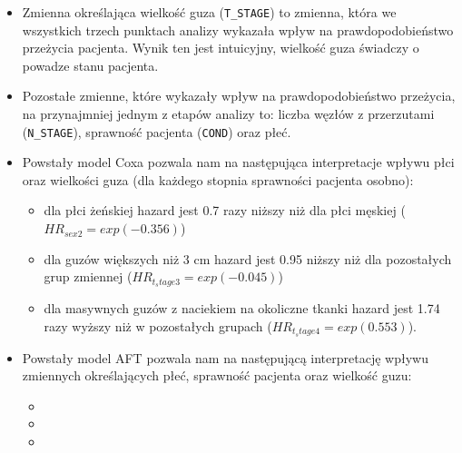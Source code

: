 \documentclass[
]{article}
\providecommand{\tightlist}{%
  \setlength{\itemsep}{0pt}\setlength{\parskip}{0pt}}
\begin{document}
\begin{itemize}
\item
  Zmienna określająca wielkość guza (\texttt{T\_STAGE}) to zmienna,
  która we wszystkich trzech punktach analizy wykazała wpływ na
  prawdopodobieństwo przeżycia pacjenta. Wynik ten jest intuicyjny,
  wielkość guza świadczy o powadze stanu pacjenta.
\item
  Pozostałe zmienne, które wykazały wpływ na prawdopodobieństwo
  przeżycia, na przynajmniej jednym z etapów analizy to: liczba węzłów z
  przerzutami (\texttt{N\_STAGE}), sprawność pacjenta (\texttt{COND})
  oraz płeć.
\item
  Powstały model Coxa pozwala nam na następująca interpretacje wpływu
  płci oraz wielkości guza (dla każdego stopnia sprawności pacjenta
  osobno):

  \begin{itemize}
  \item
    dla płci żeńskiej hazard jest 0.7 razy niższy niż dla płci męskiej
    (\(HR_{sex2} = exp(-0.356)\))
  \item
    dla guzów większych niż 3 cm hazard jest 0.95 niższy niż dla
    pozostałych grup zmiennej (\(HR_{t_stage3} = exp(-0.045)\))
  \item
    dla masywnych guzów z naciekiem na okoliczne tkanki hazard jest 1.74
    razy wyższy niż w pozostałych grupach
    (\(HR_{t_stage4} = exp(0.553)\)).
  \end{itemize}
\item
  Powstały model AFT pozwala nam na następującą interpretację wpływu
  zmiennych określających płeć, sprawność pacjenta oraz wielkość guzu:

  \begin{itemize}
  \tightlist
  \item
  \item
  \item
  \end{itemize}
\end{itemize}
\end{document}
